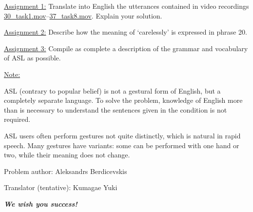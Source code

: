 \documentclass[12pt]{article}
\begin{document}
\noindent\underline{Assignment 1:} Translate into English the utterances contained in video recordings \url{30_task1.mov}--\url{37_task8.mov}. Explain your solution.

\bigskip

\noindent\underline{Assignment 2:} Describe how the meaning of `carelessly' is expressed in phrase 20.

\bigskip

\noindent\underline{Assignment 3:} Compile as complete a description of the grammar and vocabulary of ASL as possible.

\bigskip

\noindent\underline{Note:}

ASL (contrary to popular belief) is not a gestural form of English, but a completely separate language.
To solve the problem, knowledge of English more than is necessary to understand the sentences given in the condition is not required.

ASL users often perform gestures not quite distinctly, which is natural in rapid speech.
Many gestures have variants: some can be performed with one hand or two, while their meaning does not change.

\bigskip

Problem author: Aleksandrs Berdicevskis

Translator (tentative): Kumagae Yuki

\begin{center}
    \textit{\textbf{We wish you success!}}
\end{center}
\end{document}
